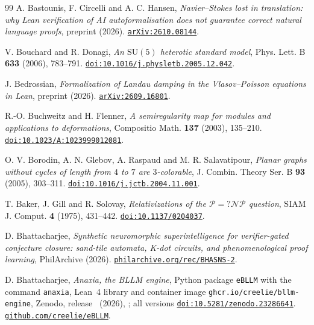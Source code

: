 \begin{thebibliography}{99}
A. Bastounis, F. Circelli and A. C. Hansen,
\emph{Navier--Stokes lost in translation: why Lean verification of AI autoformalisation does not guarantee correct natural language proofs},
preprint (2026).
\href{https://arxiv.org/abs/2610.08144}{\nolinkurl{arXiv:2610.08144}}.

V. Bouchard and R. Donagi,
\emph{An $\mathrm{SU}(5)$ heterotic standard model},
Phys. Lett. B \textbf{633} (2006), 783--791.
\href{https://doi.org/10.1016/j.physletb.2005.12.042}{\nolinkurl{doi:10.1016/j.physletb.2005.12.042}}.

J. Bedrossian,
\emph{Formalization of Landau damping in the Vlasov--Poisson equations in Lean},
preprint (2026).
\href{https://arxiv.org/abs/2609.16801}{\nolinkurl{arXiv:2609.16801}}.

R.-O. Buchweitz and H. Flenner,
\emph{A semiregularity map for modules and applications to deformations},
Compositio Math. \textbf{137} (2003), 135--210.
\href{https://doi.org/10.1023/A:1023999012081}{\nolinkurl{doi:10.1023/A:1023999012081}}.

O. V. Borodin, A. N. Glebov, A. Raspaud and M. R. Salavatipour,
\emph{Planar graphs without cycles of length from $4$ to $7$ are $3$-colorable},
J. Combin. Theory Ser. B \textbf{93} (2005), 303--311.
\href{https://doi.org/10.1016/j.jctb.2004.11.001}{\nolinkurl{doi:10.1016/j.jctb.2004.11.001}}.

T. Baker, J. Gill and R. Solovay,
\emph{Relativizations of the $\mathcal{P}=?\mathcal{NP}$ question},
SIAM J. Comput. \textbf{4} (1975), 431--442.
\href{https://doi.org/10.1137/0204037}{\nolinkurl{doi:10.1137/0204037}}.

D. Bhattacharjee,
\emph{Synthetic neuromorphic superintelligence for verifier-gated conjecture closure: sand-tile automata, K-dot circuits, and phenomenological proof learning},
PhilArchive (2026).
\href{https://philarchive.org/rec/BHASNS-2}{\nolinkurl{philarchive.org/rec/BHASNS-2}}.

D. Bhattacharjee,
\emph{Anaxia, the BLLM engine}, Python package \texttt{eBLLM} with the command \texttt{anaxia}, Lean~4 library and container image \texttt{ghcr.io/creelie/bllm-engine}, Zenodo, release~\anaxiaVersion{} (2026), \anaxiaDOIlink;
all versions \href{https://doi.org/10.5281/zenodo.23286641}{\nolinkurl{doi:10.5281/zenodo.23286641}}.
\href{https://github.com/creelie/eBLLM}{\nolinkurl{github.com/creelie/eBLLM}}.


\end{thebibliography}
